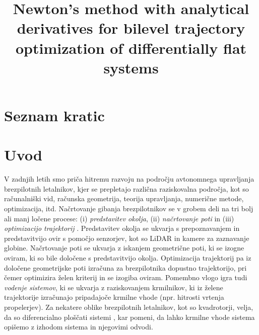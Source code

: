 \documentclass[isrm2, tisk]{fmfdelo}
\title{Newton's method with analytical derivatives for bilevel trajectory optimization of differentially flat systems}
\begin{document}
\section*{Seznam kratic}
\printacronyms[heading=none]

\section{Uvod}

V zadnjih letih smo priča hitremu razvoju na področju avtonomnega upravljanja brezpilotnih letalnikov, kjer se prepletajo različna raziskovalna področja, kot so računalniški vid, računska geometrija, teorija upravljanja, numerične metode, optimizacija, itd. Načrtovanje gibanja brezpilotnikov se v grobem deli na tri bolj ali manj ločene procese: (i) \textit{predstavitev okolja}, (ii) \textit{načrtovanje poti} in (iii) \textit{optimizacijo trajektorij} \cite{zhou2025survey}. Predstavitev okolja se ukvarja s prepoznavanjem in predstavitvijo ovir s pomočjo senzorjev, kot so LiDAR in kamere za zaznavanje globine. Načrtovanje poti se ukvarja z iskanjem geometrične poti, ki se izogne oviram, ki so bile določene s  predstavitvijo okolja. Optimizacija trajektorij pa iz določene geometrijske poti izračuna za brezpilotnika dopustno trajektorijo, pri čemer optimizira želen kriterij in se izogiba oviram. Pomembno vlogo igra tudi \textit{vodenje sistemov}, ki se ukvarja z raziskovanjem krmilnikov, ki iz želene trajektorije izračunajo pripadajoče krmilne vhode (npr. hitrosti vrtenja propelerjev). Za nekatere oblike brezpilotnih letalnikov, kot so kvadrotorji, velja, da so diferencialno ploščati sistemi \cite{mellinger2011minimum}, kar pomeni, da lahko krmilne vhode sistema opišemo z izhodom sistema in njegovimi odvodi.
\end{document}
